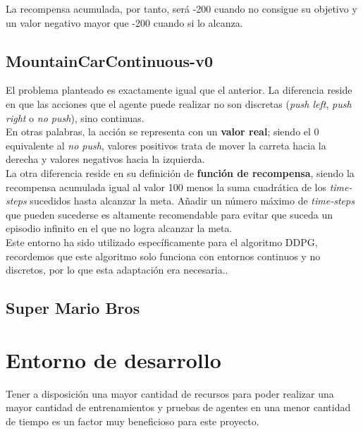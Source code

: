 \documentclass[11pt,fleqn]{book} %
\begin{document}
La recompensa acumulada, por tanto, será -200 cuando no consigue su objetivo y un valor negativo mayor que -200 cuando si lo alcanza. %

\section{MountainCarContinuous-v0}\label{sec:mountaincarcontinuo}

El problema planteado es exactamente igual que el anterior. La diferencia reside en que las acciones que el agente puede realizar no son discretas (\textit{push left}, \textit{push right} o \textit{no push}), sino continuas. \\

En otras palabras, la acción se representa con un \textbf{valor real}; siendo el 0 equivalente al \textit{no push}, valores positivos trata de mover la carreta hacia la derecha y valores negativos hacia la izquierda. \\

La otra diferencia reside en su definición de \textbf{función de recompensa}, siendo la recompensa acumulada igual al valor 100 menos la suma cuadrática de los \textit{time-steps} sucedidos hasta alcanzar la meta. Añadir un número máximo de \textit{time-steps} que pueden sucederse es altamente recomendable para evitar que suceda un episodio infinito en el que no logra alcanzar la meta. \\

Este entorno ha sido utilizado específicamente para el algoritmo DDPG, recordemos que este algoritmo solo funciona con entornos continuos y no discretos, por lo que esta adaptación era necesaria.\cite{article:mountaincontinuous}.

\section{Super Mario Bros}

\chapter{Entorno de desarrollo}\label{sec:cloud}

Tener a disposición una mayor cantidad de recursos para poder realizar una mayor cantidad de entrenamientos y pruebas de agentes en una menor cantidad de tiempo es un factor muy beneficioso para este proyecto. \\
\end{document}
